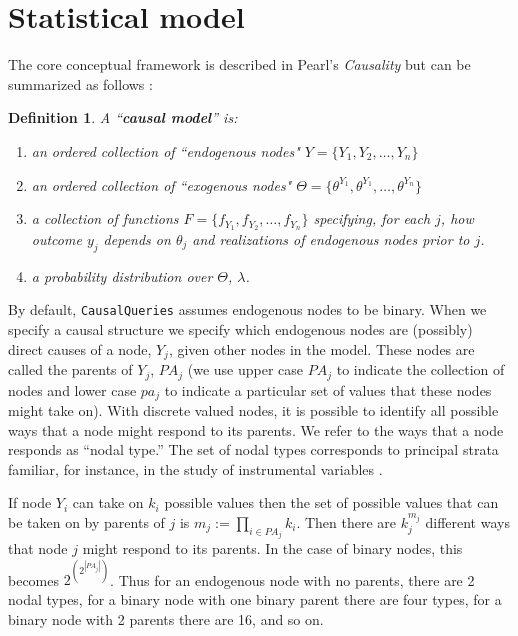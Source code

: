 \documentclass[
  11pt,
  article]{jss}
\newtheorem{definition}{Definition}
\begin{document}
\section{Statistical model}\label{sec-theory}

The core conceptual framework is described in Pearl's \emph{Causality}
\citep{pearl_causality_2009} but can be summarized as follows
\citep[using the notation proposed in][]{humphreys_integrated_2023}:

\begin{definition}
  
  A ``\textbf{causal model}'' is:
  \begin{enumerate}
    \item an ordered collection of ``endogenous nodes" $Y = \{Y_1, Y_2, \dots, Y_n\}$
    \item an ordered collection of ``exogenous nodes" $\Theta = \{\theta^{Y_1}, \theta^{Y_1}, \dots, \theta^{Y_n}\}$
    \item a collection of functions $F = \{f_{Y_1}, f_{Y_2}, \dots, f_{Y_n}\}$ specifying, for each $j$, how outcome $y_j$ depends on $\theta_j$ and realizations of endogenous nodes prior to $j$.
    \item a probability distribution over $\Theta$, $\lambda$.
  \end{enumerate}
  
\end{definition}

By default, \texttt{CausalQueries} assumes endogenous nodes to be
binary. When we specify a causal structure we specify which endogenous
nodes are (possibly) direct causes of a node, \(Y_j\), given other nodes
in the model. These nodes are called the parents of \(Y_j\), \(PA_j\)
(we use upper case \(PA_j\) to indicate the collection of nodes and
lower case \(pa_j\) to indicate a particular set of values that these
nodes might take on). With discrete valued nodes, it is possible to
identify all possible ways that a node might respond to its parents. We
refer to the ways that a node responds as ``nodal type.'' The set of
nodal types corresponds to principal strata familiar, for instance, in
the study of instrumental variables \citep{frangakis_principal_2002}.

If node \(Y_i\) can take on \(k_i\) possible values then the set of
possible values that can be taken on by parents of \(j\) is
\(m_j :=\prod_{i\in PA_j}k_i\). Then there are \(k_j^{m_j}\) different
ways that node \(j\) might respond to its parents. In the case of binary
nodes, this becomes \(2^{\left(2^{|PA_j|}\right)}\). Thus for an
endogenous node with no parents, there are 2 nodal types, for a binary
node with one binary parent there are four types, for a binary node with
2 parents there are 16, and so on.
\end{document}

